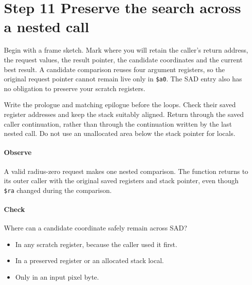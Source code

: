 \section{Step 11 Preserve the search across a nested call}\label{h263-motion-s01}
Begin with a frame sketch. Mark where you will retain the caller's return address,
the request values, the result pointer, the candidate coordinates and the current
best result. A candidate comparison reuses four argument registers, so the
original request pointer cannot remain live only in \texttt{\$a0}. The SAD entry
also has no obligation to preserve your scratch registers.

Write the prologue and matching epilogue before the loops. Check their saved
register addresses and keep the stack suitably aligned. Return through the saved
caller continuation, rather than through the continuation written by the last
nested call. Do not use an unallocated area below the stack pointer for locals.

\paragraph{Observe} A valid radius-zero request makes one nested comparison.
The function returns to its outer caller with the original saved registers and
stack pointer, even though \texttt{\$ra} changed during the comparison.
\paragraph{Check} Where can a candidate coordinate safely remain across SAD?
\begin{itemize}
  \item[A.] In any scratch register, because the caller used it first.
  \item[B.] In a preserved register or an allocated stack local.
  \item[C.] Only in an input pixel byte.
\end{itemize}
